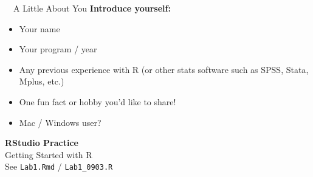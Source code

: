 \documentclass[aspectratio=169,11pt]{beamer}
\begin{document}
\begin{frame}{\ \ A Little About You}
  \textbf{\color{qrnavy}Introduce yourself:}
  \begin{itemize}
    \item Your name
    \item Your program / year
    \item Any previous experience with R (or other stats software such as
          SPSS, Stata, Mplus, etc.)
    \item One fun fact or hobby you'd like to share!
    \item Mac / Windows user?
  \end{itemize}
\end{frame}

{
\begin{frame}
  \vfill
  \centering
  {\color{qrnavy}\Huge\bfseries RStudio Practice}\\[0.8em]
  {\color{qrblue}\large Getting Started with R}\\[0.4em]
  {\color{qrgray} See \texttt{Lab1.Rmd} / \texttt{Lab1\_0903.R}}
  \vfill
\end{frame}
}
\end{document}
